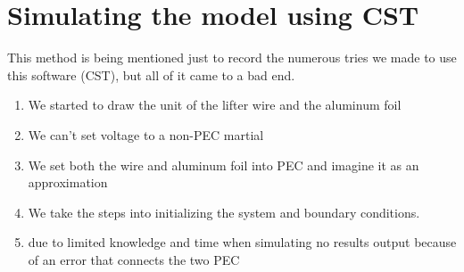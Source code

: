 \section*{Simulating the model using CST}
\hspace{\parindent}This method is being mentioned just to record the numerous tries we made to use this software (CST), but all of it came to a bad end.
\begin{enumerate}
    \item We started to draw the unit of the lifter wire and the aluminum foil
    \item We can’t set voltage to a non-PEC martial 
    \item We set both the wire and aluminum foil into PEC and imagine it as an approximation 
    \item We take the steps into initializing the system and boundary conditions.
    \item due to limited knowledge and time when simulating no results output because of an error that connects the two PEC
\end{enumerate}
